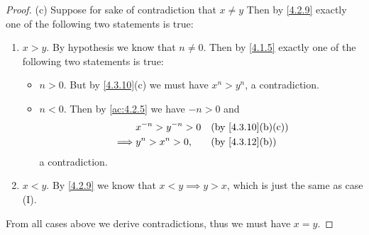 \begin{proof}{(c)}
  Suppose for sake of contradiction that \(x \neq y\)
  Then by \cref{4.2.9} exactly one of the following two statements is true:
  \begin{enumerate}[label=(\Roman*)]
    \item \(x > y\).
          By hypothesis we know that \(n \neq 0\).
          Then by \cref{4.1.5} exactly one of the following two statements is true:
          \begin{itemize}
            \item \(n > 0\).
                  But by \cref{4.3.10}(c) we must have \(x^n > y^n\), a contradiction.
            \item \(n < 0\).
                  Then by \cref{ac:4.2.5} we have \(-n > 0\) and
                  \begin{align*}
                             & x^{-n} > y^{-n} > 0 &  & \text{(by \cref{4.3.10}(b)(c))} \\
                    \implies & y^n > x^n > 0,      &  & \text{(by \cref{4.3.12}(b))}
                  \end{align*}
                  a contradiction.
          \end{itemize}
    \item \(x < y\).
          By \cref{4.2.9} we know that \(x < y \implies y > x\), which is just the same as case (I).
  \end{enumerate}
  From all cases above we derive contradictions, thus we must have \(x = y\).
\end{proof}

